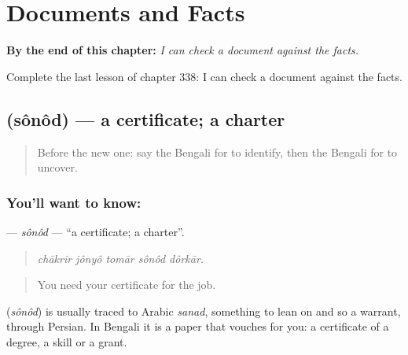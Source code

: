 
\chapter{Documents and Facts}
\label{ch:bn-documents-and-facts}

\begin{chapteropening}
\textbf{By the end of this chapter:} \emph{I can check a document against the facts.}

Complete the last lesson of chapter 338: I can check a document against the facts.
\end{chapteropening}

\section[\texorpdfstring{\bn{সনদ} (sônôd)}{সনদ (sônôd)}]{ (sônôd) — a certificate; a charter}

\label{lesson:BN-C338-sonod}



\begin{quote}
Before the new one: say the Bengali for to identify, then the Bengali for to uncover.
\end{quote}

\subsection*{You'll want to know: }
\textbf{} — \emph{sônôd} — \textquotedblleft{}a certificate; a charter\textquotedblright{}.

\begin{quote}
    
\end{quote}

\begin{quote}
\emph{chākrir jônyô tomār sônôd dôrkār.}
\end{quote}

\begin{quote}
You need your certificate for the job.
\end{quote}

\begin{cousinweb}
\textbf{} (\emph{sônôd}) is usually traced to Arabic \emph{sanad}, something to lean on and so a warrant, through Persian. In Bengali it is a paper that vouches for you: a certificate of a degree, a skill or a grant.
\end{cousinweb}


